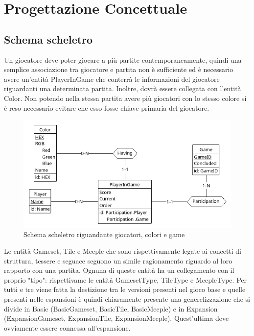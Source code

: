 \section{Progettazione Concettuale}
\subsection{Schema scheletro}
Un giocatore deve poter giocare a più partite contemporaneamente, quindi una semplice associazione tra giocatore e partita non è sufficiente ed è necessario avere un'entità PlayerInGame che conterrà le informazioni del giocatore riguardanti una determinata partita. Inoltre, dovrà essere collegata con l'entità Color. Non potendo nella stessa partita avere più giocatori con lo stesso colore si è reso necessario evitare che esso fosse chiave primaria del giocatore.
\begin{figure}[hb]
    \centering\includegraphics[scale=0.24]{images/Progettazione/Concettuale/Scheletro1.png}
    \caption{Schema scheletro riguandante giocatori, colori e game}
\end{figure}
\medskip
Le entità Gameset, Tile e Meeple che sono rispettivamente legate ai concetti di struttura, tessere e seguace seguono un simile ragionamento riguardo al loro rapporto con una partita. Ognuna di queste entità ha un collegamento con il proprio "tipo": rispettivame le entità GamesetType, TileType e MeepleType. Per tutti e tre viene fatta la destizione tra le versioni presenti nel gioco base e quelle presenti nelle espansioni è quindi chiaramente presente una generelizzazione che si divide in Basic (BasicGameset, BasicTile, BasicMeeple) e in Expansion (ExpansionGameset, ExpansionTile, ExpansionMeeple). Quest'ultima deve ovviamente essere connessa all'espansione.

